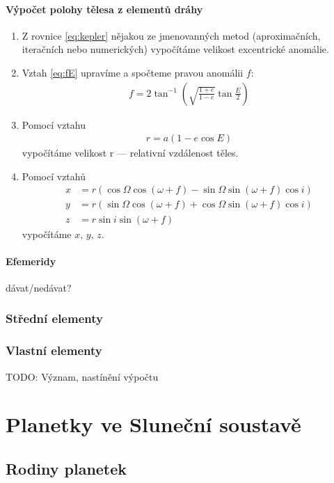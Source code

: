 \documentclass[A4paper, 12pt, oneside]{book}
\begin{document}
\subsubsection{Výpočet polohy tělesa z elementů dráhy}
\begin{enumerate}[label=\arabic*.]
	\item Z rovnice \eqref{eq:kepler} nějakou ze jmenovanných metod (aproximačních, iteračních nebo numerických) vypočítáme velikost excentrické anomálie.
	\item Vztah \eqref{eq:fE} upravíme a spočteme pravou anomálii $f$:
		\begin{align}
			f = 2\tan^{-1}(\sqrt{\frac{1+e}{1-e}}\tan \frac{E}{2})
		\end{align}
	\item Pomocí vztahu 
		\begin{align}
			r=a(1-e\cos E)
		\end{align}
		vypočítáme velikost r --- relativní vzdálenost těles.
	\item Pomocí vztahů
		\begin{align}
			x&=r(\cos\Omega\cos(\omega+f)-\sin\Omega\sin(\omega+f)\cos i) \\
			y&=r(\sin\Omega\cos(\omega+f)+\cos\Omega\sin(\omega+f)\cos i) \\
			z&=r\sin i\sin(\omega+f)
		\end{align}
		vypočítáme $x,\,y,\,z$.
\end{enumerate}

\subsubsection{Efemeridy} dávat/nedávat?

\subsection{Střední elementy}


\subsection{Vlastní elementy}
TODO: Význam, nastínění výpočtu

\chapter{Planetky ve Sluneční soustavě}
\section{Rodiny planetek}
\end{document}

